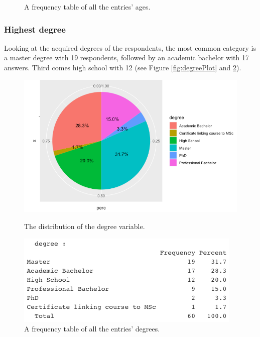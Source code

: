 \begin{figure}[!htb]
	\caption{A frequency table of all the entries' ages.}\label{fig:ageFreq}
	\endminipage\hfill
\end{figure}


\subsubsection{Highest degree}
Looking at the acquired degrees of the respondents, the most common category is a master degree with 19 respondents, followed by an academic bachelor with 17 answers. Third comes high school with 12 (see Figure \ref{fig:degreePlot} and \ref{fig:degreeFreq}).
\begin{figure}[htb!]
	\includegraphics[width=\linewidth]{../LaTeX/Figures/Environments/DegreePlot.png}
	\caption{The distribution of the degree variable.}\label{fig:degreePlot}
	\endminipage\hfill
	\includegraphics[width=\linewidth]{../LaTeX/Figures/Environments/DegreeFreq.png}
	\caption{A frequency table of all the entries' degrees.}\label{fig:degreeFreq}
	\endminipage\hfill
\end{figure}

